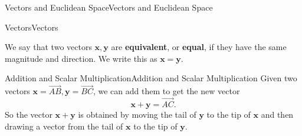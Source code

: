 \documentclass[10pt,]{book}
\newcommand{\terminology}[1]{\textbf{#1}}
\numberwithin{equation}{section}
\newcommand{\vv}[1]{\mathbf{#1}}
\begin{document}
\begin{chapterptx}{Vectors and Euclidean Space}{}{Vectors and Euclidean Space}{}{}
\begin{sectionptx}{Vectors}{}{Vectors}{}{}
\begin{introduction}{}
\hypertarget{p-866}{}%
We say that two vectors \(\vv{x},\vv{y}\) are \terminology{equivalent}, or \terminology{equal}, if they have the same magnitude and direction. We write this as \(\vv{x} = \vv{y}\).%
\end{introduction}%
%
%
\typeout{************************************************}
\typeout{************************************************}
%
\begin{subsectionptx}{Addition and Scalar Multiplication}{}{Addition and Scalar Multiplication}{}{}\label{subsection-addition-and-scalar-multiplication}
\hypertarget{p-867}{}%
Given two vectors \(\vv{x} = \overrightarrow{AB},\vv{y}=\overrightarrow{BC}\), we can add them to get the new vector%
%
\begin{equation*}
\vv{x}+\vv{y} = \overrightarrow{AC}.
\end{equation*}
\hypertarget{p-868}{}%
So the vector \(\vv{x}+\vv{y}\) is obtained by moving the tail of \(\vv{y}\) to the tip of \(\vv{x}\) and then drawing a vector from the tail of \(\vv{x}\) to the tip of \(\vv{y}\).%
\begin{figure}
\centering
{
}
\end{figure}
\end{subsectionptx}
\end{sectionptx}
\end{chapterptx}
\end{document}
